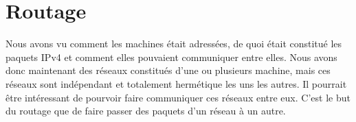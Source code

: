 \section{Routage}

Nous avons vu comment les machines était adressées, de quoi était constitué les
paquets IPv4 et comment elles pouvaient communiquer entre elles.  Nous avons
donc maintenant des réseaux constitués d'une ou plusieurs machine, mais ces
réseaux sont indépendant et totalement hermétique les uns les autres. Il
pourrait être intéressant de pourvoir faire communiquer ces réseaux entre eux.
C'est le but du routage que de faire passer des paquets d'un réseau à un autre.
